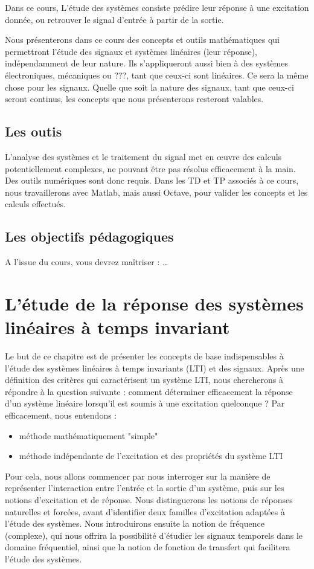 \documentclass[]{report}
\begin{document}
	Dans ce cours, L'étude des systèmes consiste prédire leur réponse à une excitation donnée, ou retrouver le signal d'entrée à partir de la sortie. 
	
	Nous présenterons dans ce cours des concepts et outils mathématiques qui permettront l'étude des signaux et systèmes linéaires (leur réponse), indépendamment de leur nature. Ils s'appliqueront aussi bien à des systèmes électroniques, mécaniques ou ???, tant que ceux-ci sont linéaires. Ce sera la même chose pour les signaux. Quelle que soit la nature des signaux, tant que ceux-ci seront continus, les concepts que nous présenterons resteront valables.
	
	
	\section{Les outis}
	L'analyse des systèmes et le traitement du signal met en œuvre des calculs potentiellement complexes, ne pouvant être pas résolus efficacement à la main. Des outils numériques sont donc requis.
	Dans les TD et TP associés à ce cours, nous travaillerons avec Matlab, mais aussi Octave, pour valider les concepts et les calculs effectués.
	
	
	\section{Les objectifs pédagogiques}
	A l'issue du cours, vous devrez maîtriser : 	…
	
	
\chapter{L'étude de la réponse des systèmes linéaires à temps invariant}
	Le but de ce chapitre est de présenter les concepts de base indispensables à l'étude des systèmes linéaires à temps invariants (LTI) et des signaux.
	Après une définition des critères qui caractérisent un système LTI, nous chercherons à répondre à la question suivante :
	comment déterminer efficacement la réponse d'un système linéaire lorsqu'il est soumis à une excitation quelconque ? Par efficacement, nous entendons :
	\begin{itemize}
		\item méthode mathématiquement "simple"
		\item méthode indépendante de l'excitation et des propriétés du système LTI
	\end{itemize}
	
	
	Pour cela, nous allons commencer par nous interroger sur la manière de représenter l'interaction entre l'entrée et la sortie d'un système, puis sur les notions d'excitation et de réponse. Nous distinguerons les notions de réponses naturelles et forcées, avant d'identifier deux familles d'excitation adaptées à l'étude des systèmes. Nous introduirons ensuite la notion de fréquence (complexe), qui nous offrira la possibilité d'étudier les signaux temporels dans le domaine fréquentiel,	ainsi que la notion de fonction de transfert qui facilitera l'étude des systèmes.
	
\end{document}
